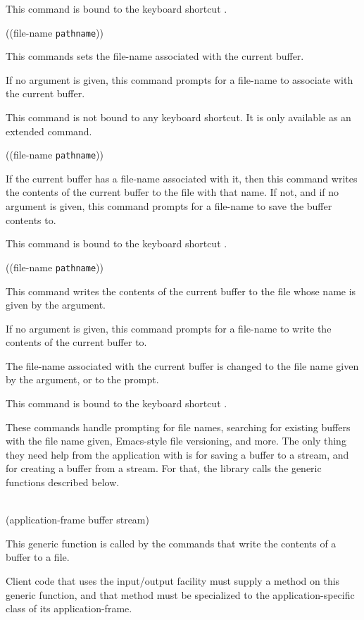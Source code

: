 This command is bound to the keyboard shortcut .

 {((file-name
  \texttt{pathname}))}

This commands sets the file-name associated with the current buffer.

If no argument is given, this command prompts for a file-name to
associate with the current buffer.

This command is not bound to any keyboard shortcut.  It is only
available as an extended command.

 {((file-name \texttt{pathname}))}

If the current buffer has a file-name associated with it, then this
command writes the contents of the current buffer to the file with
that name.  If not, and if no argument is given, this command prompts
for a file-name to save the buffer contents to.

This command is bound to the keyboard shortcut .

 {((file-name \texttt{pathname}))}

This command writes the contents of the current buffer to the file
whose name is given by the argument.

If no argument is given, this command prompts for a file-name to
write the contents of the current buffer to.

The file-name associated with the current buffer is changed to the
file name given by the argument, or to the prompt.

This command is bound to the keyboard shortcut .

These commands handle prompting for file names, searching for existing
buffers with the file name given, Emacs-style file versioning, and
more.  The only thing they need help from the application with is for
saving a buffer to a stream, and for creating a buffer from a stream.
For that, the \sysname{} library calls the generic functions described
below.

\\
{(application-frame buffer stream)}

This generic function is called by the commands that write the
contents of a buffer to a file.

Client code that uses the \sysname{} input/output facility must supply
a method on this generic function, and that method must be specialized
to the application-specific class of its application-frame.

